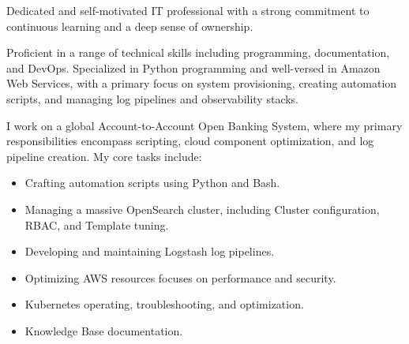 \documentclass[10pt,a4paper]{altacv}
\begin{document}



\begin{fullwidth}
    \makecvheader
\end{fullwidth}



Dedicated and self-motivated IT professional with a strong commitment to continuous learning and a deep sense of ownership. 

\bigskip

Proficient in a range of technical skills including programming, documentation, and DevOps. Specialized in Python programming and well-versed in Amazon Web Services, with a primary focus on system provisioning, creating automation scripts, and managing log pipelines and observability stacks.



I work on a global Account-to-Account Open Banking System, where my primary responsibilities encompass scripting, cloud component optimization, and log pipeline creation. My core tasks include:

\bigskip

\begin{itemize}
    \item Crafting automation scripts using Python and Bash.
    \item Managing a massive OpenSearch cluster, including Cluster configuration, RBAC, and Template tuning.
    \item Developing and maintaining Logstash log pipelines.
    \item Optimizing AWS resources focuses on performance and security.
    \item Kubernetes operating, troubleshooting, and optimization.
    \item Knowledge Base documentation.
\end{itemize}
\end{document}
